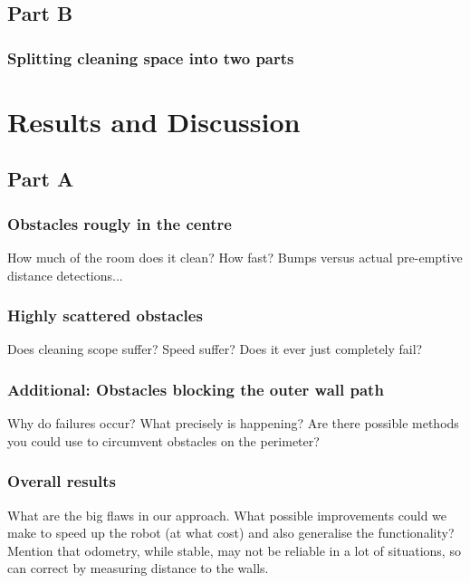 \documentclass[11pt, a4paper]{article}
\begin{document}
\subsection*{Part B}
\subsubsection*{Splitting cleaning space into two parts}


\section{Results and Discussion}
\subsection{Part A}
\subsubsection*{Obstacles rougly in the centre}
How much of the room does it clean? How fast? Bumps versus actual pre-emptive distance detections...
\subsubsection*{Highly scattered obstacles}
Does cleaning scope suffer? Speed suffer? Does it ever just completely fail?
\subsubsection*{Additional: Obstacles blocking the outer wall path}
Why do failures occur? What precisely is happening? Are there possible methods you could use to circumvent obstacles on the perimeter?
\subsubsection*{Overall results}
What are the big flaws in our approach. What possible improvements could we make to speed up the robot (at what cost) and also generalise the functionality? Mention that odometry, while stable, may not be reliable in a lot of situations, so can correct by measuring distance to the walls.
\end{document}
